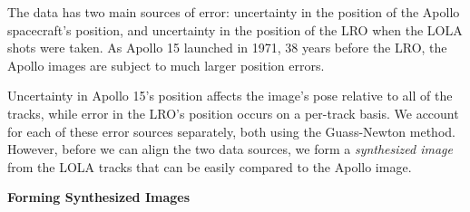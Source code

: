 
The data has two main sources of error: uncertainty in the position of the Apollo spacecraft's
position, and uncertainty in the position of the LRO when the LOLA shots were taken.
As Apollo 15 launched in 1971, 38 years
before the LRO, the Apollo images are subject to much larger position errors.

Uncertainty in Apollo 15's position affects the image's pose relative to all of the tracks, while
error in the LRO's position occurs on a per-track basis. We account for each of these
error sources separately, both using the Guass-Newton method. However, before we can align
the two data sources, we form a \emph{synthesized image} from the LOLA tracks that
can be easily compared to the Apollo image.


{\bf Forming Synthesized Images}

